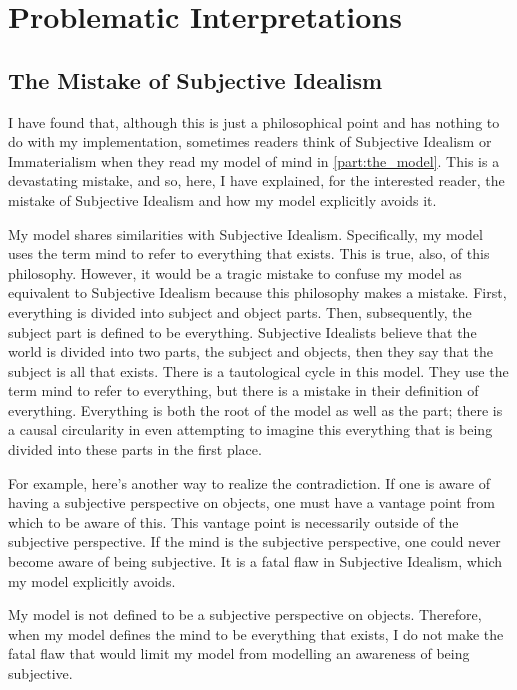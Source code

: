 \chapter{Problematic Interpretations}
\label{chapter:problematic_interpretations}

\section{The Mistake of Subjective Idealism}
\label{section:the_mistake_of_subjective_idealism}

I have found that, although this is just a philosophical point and has
nothing to do with my implementation, sometimes readers think of
Subjective Idealism or Immaterialism \citep{berkeley:1734} when they
read my model of mind in \autoref{part:the_model}.  This is a
devastating mistake, and so, here, I have explained, for the
interested reader, the mistake of Subjective Idealism and how my model
explicitly avoids it.

My model shares similarities with Subjective Idealism.  Specifically,
my model uses the term mind to refer to everything that exists.  This
is true, also, of this philosophy.  However, it would be a tragic
mistake to confuse my model as equivalent to Subjective Idealism
because this philosophy makes a mistake.  First, everything is divided
into subject and object parts.  Then, subsequently, the subject part
is defined to be everything.  Subjective Idealists believe that the
world is divided into two parts, the subject and objects, then they
say that the subject is all that exists.  There is a tautological
cycle in this model.  They use the term mind to refer to everything,
but there is a mistake in their definition of everything.  Everything
is both the root of the model as well as the part; there is a causal
circularity in even attempting to imagine this everything that is
being divided into these parts in the first place.

For example, here's another way to realize the contradiction.  If one
is aware of having a subjective perspective on objects, one must have
a vantage point from which to be aware of this.  This vantage point is
necessarily outside of the subjective perspective.  If the mind is the
subjective perspective, one could never become aware of being
subjective.  It is a fatal flaw in Subjective Idealism, which my model
explicitly avoids.

My model is not defined to be a subjective perspective on objects.
Therefore, when my model defines the mind to be everything that
exists, I do not make the fatal flaw that would limit my model from
modelling an awareness of being subjective.

